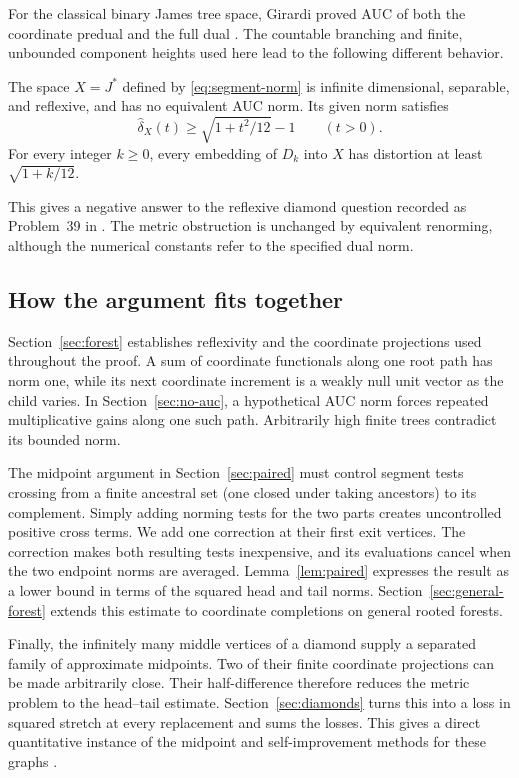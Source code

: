 

For the classical binary James tree space, Girardi proved AUC of both
the coordinate predual and the full dual
\cite[Theorems~3 and~5]{Girardi2001}. The countable branching and finite,
unbounded component heights used here lead to the following different
behavior.

\begin{theorem}\label{thm:main}
The space $X=J^*$ defined by \eqref{eq:segment-norm} is infinite
dimensional, separable, and reflexive, and has no equivalent AUC norm.
Its given norm satisfies
\[
 \widehat\delta_X(t)\ge\sqrt{1+t^2/12}-1\qquad(t>0).
\]
For every integer $k\ge0$, every embedding of $D_k$ into $X$ has
distortion at least $\sqrt{1+k/12}$.
\end{theorem}

This gives a negative answer to the reflexive diamond question recorded
as Problem~39 in \cite[author manuscript p.~388]{BaudierLancien2025}. The metric obstruction is
unchanged by equivalent renorming, although the numerical constants
refer to the specified dual norm.

\subsection{How the argument fits together}

Section~\ref{sec:forest} establishes reflexivity and the coordinate
projections used throughout the proof. A sum of coordinate functionals
along one root path has norm one, while its next coordinate increment
is a weakly null unit vector as the child varies. In
Section~\ref{sec:no-auc}, a hypothetical AUC norm forces repeated
multiplicative gains along one such path. Arbitrarily high finite trees
contradict its bounded norm.

The midpoint argument in Section~\ref{sec:paired} must control segment
tests crossing from a finite ancestral set (one closed under taking ancestors) to its
complement. Simply
adding norming tests for the two parts creates uncontrolled positive
cross terms. We add one correction at their first exit vertices. The
correction makes both resulting tests inexpensive, and its evaluations
cancel when the two endpoint norms are averaged. Lemma~\ref{lem:paired}
expresses the result as a lower bound in terms of the squared head and
tail norms.
Section~\ref{sec:general-forest} extends this estimate to coordinate
completions on general rooted forests.

Finally, the infinitely many middle vertices of a diamond supply a
separated family of approximate midpoints. Two of their finite
coordinate projections can be made arbitrarily close. Their
half-difference therefore reduces the metric problem to the head--tail
estimate. Section~\ref{sec:diamonds} turns this into a loss in squared
stretch at every replacement and sums the losses. This gives a direct
quantitative instance of the midpoint and self-improvement methods for
these graphs \cite[Section~4]{BaudierEtAl2017}.
